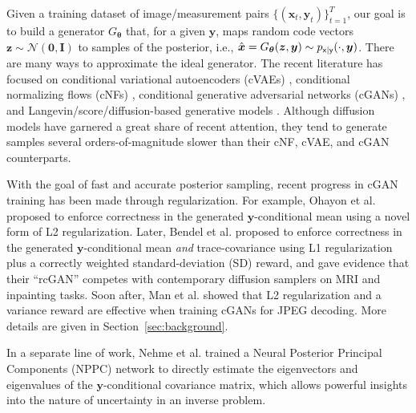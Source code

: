\documentclass{article}
\theoremstyle{plain}
\theoremstyle{definition}
\theoremstyle{remark}
\newcommand{\hvec}[1]{\ensuremath{\Hat{\boldsymbol{#1}}}}
\renewcommand{\vec}[1]{\ensuremath{\boldsymbol{#1}}}
\newcommand{\mc}[1]{\ensuremath{\mathcal{#1}}}
\newcommand{\Secref}[1]{Section~\ref{sec:#1}}
\newcommand{\pxgy}{p_{\mathsf{x}|\mathsf{y}}}
\begin{document}
Given a training dataset of image/measurement pairs $\{(\vec{x}_t, \vec{y}_t)\}_{t=1}^T$, our goal is to build a generator $G_{\vec{\theta}}$ that, for a given $\vec{y}$, maps random code vectors $\vec{z}\sim\mc{N}(\vec{0}, \vec{I})$ to samples of the posterior, i.e., $\hvec{x}=G_{\vec{\theta}}(\vec{z}, \vec{y})\sim\pxgy(\cdot, \vec{y})$.
There are many ways to approximate the ideal generator.
The recent literature has focused on 
conditional variational autoencoders (cVAEs) \cite{Edupuganti:TMI:20,Tonolini:JMLR:20,Sohn:NIPS:15}, 
conditional normalizing flows (cNFs) \cite{Ardizzone:19,Winkler:19,Sun:AAAI:21, Wen:ICML:23}, 
conditional generative adversarial networks (cGANs) \cite{Isola:CVPR:17,Adler:18,Zhao:ICLR:21,Zhao:MIA:18, Bendel:NIPS:23},
and Langevin/score/diffusion-based generative models \cite{Welling:ICML:11,Song:NIPS:20,Jalal:NIPS:21,Song:ICLR:21,Song:ICLR:22, Kawar:NIPS:22, Chung:ICLR:23, Wang:ICLR:23}.
Although diffusion models have garnered a great share of recent attention, they tend to generate samples several orders-of-magnitude slower than their cNF, cVAE, and cGAN counterparts.

With the goal of fast and accurate posterior sampling, recent progress in cGAN training has been made through regularization. 
For example, Ohayon et al. \cite{Ohayon:ICCVW:21} proposed to enforce correctness in the generated $\vec{y}$-conditional mean using a novel form of L2 regularization. 
Later, Bendel et al. \cite{Bendel:NIPS:23} proposed to enforce correctness in the generated $\vec{y}$-conditional mean \emph{and} trace-covariance using L1 regularization plus a correctly weighted standard-deviation (SD) reward, and gave evidence that their ``rcGAN'' competes with contemporary diffusion samplers on MRI and inpainting tasks.
Soon after, Man et al. \cite{Man:CVPRW:23} showed that L2 regularization and a variance reward are effective when training cGANs for JPEG decoding.
More details are given in \Secref{background}.

In a separate line of work, Nehme et al. \cite{Nehme:NIPS:23} trained a Neural Posterior Principal Components (NPPC) network to directly estimate the eigenvectors and eigenvalues of the $\vec{y}$-conditional covariance matrix, which allows powerful insights into the nature of uncertainty in an inverse problem.


\end{document}
